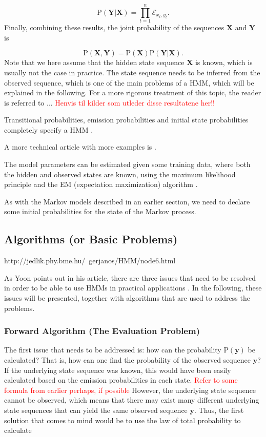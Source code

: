 \documentclass{article}
\begin{document}
\begin{equation*}
    \text{P}(\mathbf{Y}|\mathbf{X}) = \prod_{t=1}^n\mathcal{E}_{x_t,y_t}.
\end{equation*}
Finally, combining these results, the joint probability of the sequences $\mathbf{X}$ and $\mathbf{Y}$ is 

\begin{equation*}
    \text{P}(\mathbf{X}, \mathbf{Y}) = \text{P}(\mathbf{X})\text{P}(\mathbf{Y}|\mathbf{X}).
\end{equation*}
Note that we here assume that the hidden state sequence $\mathbf{X}$ is known, which is usually not the case in practice. The state sequence needs to be inferred from the observed sequence, which is one of the main problems of a HMM, which will be explained in the following. For a more rigorous treatment of this topic, the reader is referred to ... \textcolor{red}{Henvis til kilder som utleder disse resultatene her!!}

Transitional probabilities, emission probabilities and initial state probabilities completely specify a HMM \cite{Yoon2009}.

A more technical article with more examples is \cite{Yoon2009}.

The model parameters can be estimated given some training data, where both the hidden and observed states are known, using the maximum likelihood principle and the EM (expectation maximization) algorithm \cite{Christianini2006}.

As with the Markov models described in an earlier section, we need to declare some initial probabilities for the state of the Markov process. 

\subsection{Algorithms (or Basic Problems)}
http://jedlik.phy.bme.hu/~gerjanos/HMM/node6.html

As Yoon points out in his article, there are three issues that need to be resolved in order to be able to use HMMs in practical applications \cite{Yoon2009}. In the following, these issues will be presented, together with algorithms that are used to address the problems. 

\subsubsection{Forward Algorithm (The Evaluation Problem)}
The first issue that needs to be addressed is: how can the probability $\text{P}(\mathbf{y})$ be calculated? That is, how can one find the probability of the observed sequence $\mathbf{y}$? If the underlying state sequence was known, this would have been easily calculated based on the emission probabilities in each state. \textcolor{red}{Refer to some formula from earlier perhaps, if possible} However, the underlying state sequence cannot be observed, which means that there may exist many different underlying state sequences that can yield the same observed sequence $\mathbf{y}$. Thus, the first solution that comes to mind would be to use the law of total probability to calculate
\end{document}

